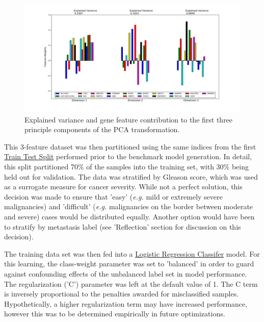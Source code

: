 \documentclass[final]{article}
\begin{document}
\begin{figure}[h]
  \centering
  \includegraphics[width=\textwidth]{pcaEV}
  \caption{Explained variance and gene feature contribution to the first three principle components of the PCA transformation.\label{fig:pcaEV}}
\end{figure}

This 3-feature dataset was then partitioned using the same indices from the
first \href{http://scikit-learn.org/stable/modules/generated/sklearn.cross_validation.train_test_split.html}{Train Test Split}
performed prior to the benchmark model generation.  In detail, this
split partitioned 70\% of the samples into the training set, with 30\% being held
out for validation.  The data was stratified by Gleason score, which was used
as a surrogate measure for cancer severity. While not a perfect solution, this
decision was made to ensure that 'easy' (\textit{e.g.} mild or extremely severe
malignancies) and 'difficult' (\textit{e.g.} malignancies on the border between
moderate and severe) cases would be distributed equally.  Another option would
have been to stratify by  metastasis label (see 'Reflection' section for  %
discussion on this decision).

The training data set was then fed into a
\href{http://scikit-learn.org/stable/modules/generated/sklearn.linear_model.LogisticRegression.html}{Logistic
Regression Classifer} model.  For this learning, the class-weight parameter was
set to 'balanced' in order to guard against confounding effects of the
unbalanced label set in model performance.  The regularization ('C') parameter
was left at the default value of 1.  The C term is inversely proportional to the
penalties awarded for misclassified samples. Hypothetically, a higher
regularization term may have increased performance, however this was to be
determined empirically in future optimizations.
\end{document}
